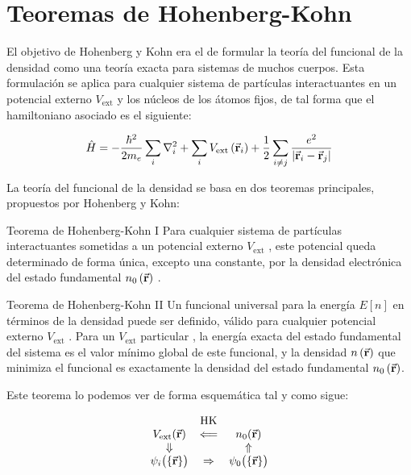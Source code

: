\section{Teoremas de Hohenberg-Kohn}

El objetivo de Hohenberg y Kohn era el de formular la teoría del funcional de la densidad como una teoría exacta para sistemas de muchos cuerpos. Esta formulación se aplica para cualquier sistema de partículas interactuantes en un potencial externo $V_{\text{ext}}$ y los núcleos de los átomos fijos, de tal forma que el hamiltoniano asociado es el siguiente:

\begin{equation}
    \hat{H} = - \frac{\hbar^2}{2 m_{e}} \sum_i \nabla_{i}^2 + \sum_i V_{\text{ext}}  \left( \va{r}_i  \right)  + \frac{1}{2} \sum_{i \neq j} \frac{e^2}{\abs{ \va{r}_i - \va{r}_j} }
\end{equation}

La teoría del funcional de la densidad se basa en dos teoremas principales, propuestos por Hohenberg y Kohn:

\begin{mytheo}{Teorema de Hohenberg-Kohn I}{}
    Para cualquier sistema de partículas interactuantes sometidas a un potencial externo $V_{\text{ext}}$ , este potencial queda determinado de forma única, excepto una constante, por la densidad electrónica del estado fundamental $n_0 \left( \va{r} \right)$ .
\end{mytheo}

\begin{mytheo}{Teorema de Hohenberg-Kohn II}{}
    Un funcional universal para la energía $E \left[ n \right]$ en términos de la densidad puede ser definido, válido para cualquier potencial externo $V_{\text{ext}}$ . Para un  $V_{\text{ext}}$ particular , la energía exacta del estado fundamental del sistema es el valor mínimo global de este funcional, y la densidad $n \left( \va{r} \right)$ que minimiza el funcional es exactamente la densidad del estado fundamental $n_0 \left( \va{r} \right)$.
\end{mytheo}


Este teorema lo podemos ver de forma esquemática tal y como sigue:

\begin{equation}
\begin{array}{ccc}
   & \text{HK} & \\
   V_{\text{ext}}(\va{r}) 
     & \Longleftarrow 
     & n_0(\va{r}) \\
   \Downarrow 
     & 
     & \Uparrow \\
   \psi_i\bigl(\{\va{r}\}\bigr) 
     & \Rightarrow 
     & \psi_0\bigl(\{\va{r}\}\bigr)
\end{array}
\end{equation}

